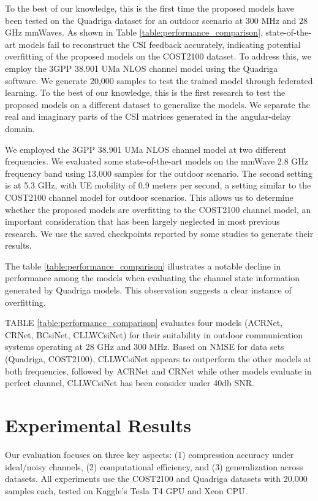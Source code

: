 \documentclass[lettersize,journal]{IEEEtran}
\begin{document}
To the best of our knowledge, this is the first time the proposed models have been tested on the Quadriga dataset for an outdoor scenario at 300 MHz and 28 GHz mmWaves. As shown in Table
 \ref{table:performance_comparison}, state-of-the-art models fail to reconstruct the CSI feedback accurately, indicating potential overfitting of the proposed models on the COST2100 dataset. To address this, we employ the 3GPP 38.901 UMa NLOS channel model using the Quadriga software. We generate 20,000 samples to test the trained model through federated learning. To the best of our knowledge, this is the first research to test the proposed models on a different dataset to generalize the models. We separate the real and imaginary parts of the CSI matrices generated in the angular-delay domain.

We employed the 3GPP 38.901 UMa NLOS channel model at two different frequencies. We evaluated some state-of-the-art models on the mmWave 2.8 GHz frequency band using 13,000 samples for the outdoor scenario. The second setting is at 5.3 GHz, with UE mobility of 0.9 meters per second, a setting similar to the COST2100 channel model for outdoor scenarios. This allows us to determine whether the proposed models are overfitting to the COST2100 channel model, an important consideration that has been largely neglected in most previous research. We use the saved checkpoints reported by some studies to generate their results.

    



The table \ref{table:performance_comparison} illustrates a notable decline in performance among the models when evaluating the channel state information generated by Quadriga models. This observation suggests a clear instance of overfitting.

TABLE \ref{table:performance_comparison} evaluates four models (ACRNet, CRNet, BCsiNet, CLLWCsiNet) for their suitability in outdoor communication systems operating at 28 GHz and 300 MHz. Based on NMSE for data sets (Quadriga, COST2100), CLLWCsiNet appears to outperform the other models at both frequencies, followed by ACRNet and CRNet while other models evaluate in perfect channel, CLLWCsiNet has been consider under 40db SNR.


\section{Experimental Results}
\label{sec:results}
Our evaluation focuses on three key aspects: (1) compression accuracy under ideal/noisy channels, (2) computational efficiency, and (3) generalization across datasets. All experiments use the COST2100 and Quadriga datasets with 20,000 samples each, tested on Kaggle's Tesla T4 GPU and Xeon CPU.
\end{document}
